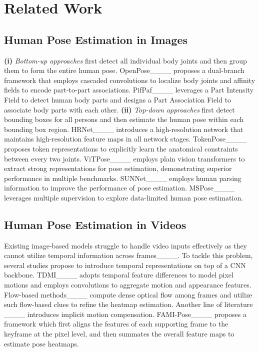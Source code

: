 \section{Related Work}
\label{sec:related}

\subsection{Human Pose Estimation in Images}
 	 \textbf{(i)} \emph{Bottom-up approaches} first detect all individual body joints and then group them to form the entire human pose. OpenPose____ proposes a dual-branch framework that employs cascaded convolutions to localize body joints and affinity fields to encode part-to-part associations. PifPaf____ leverages a Part Intensity Field to detect human body parts and designs a Part Association Field to associate body parts with each other. \textbf{(ii)} \emph{Top-down approaches} first detect bounding boxes for all persons and then estimate the human pose within each bounding box region. HRNet____ introduces a high-resolution network that maintains high-resolution feature maps in all network stages. TokenPose____ proposes token representations to explicitly learn the anatomical constraints between every two joints. ViTPose____ employs plain vision transformers to extract strong representations for pose estimation, demonstrating superior performance in multiple benchmarks.  SUNNet____ employs human parsing information to improve the performance of pose estimation. MSPose____ leverages multiple supervision to explore data-limited human pose estimation. 
 	


 \subsection{Human Pose Estimation in Videos}
  Existing image-based models struggle to handle video inputs effectively as they cannot utilize temporal information across frames____. To tackle this problem, several studies propose to introduce temporal representations on top of a CNN backbone. TDMI____ adopts temporal feature differences to model pixel motions and employs convolutions to aggregate motion and appearance features. Flow-based methods____ compute dense optical flow among frames and utilize such flow-based clues to refine the heatmap estimation.  
   Another line of literature ____ introduces implicit motion compensation. FAMI-Pose____ proposes a framework which first aligns the features of each supporting frame to the keyframe at the pixel level, and then summates the overall feature maps to estimate pose heatmaps. 
  
